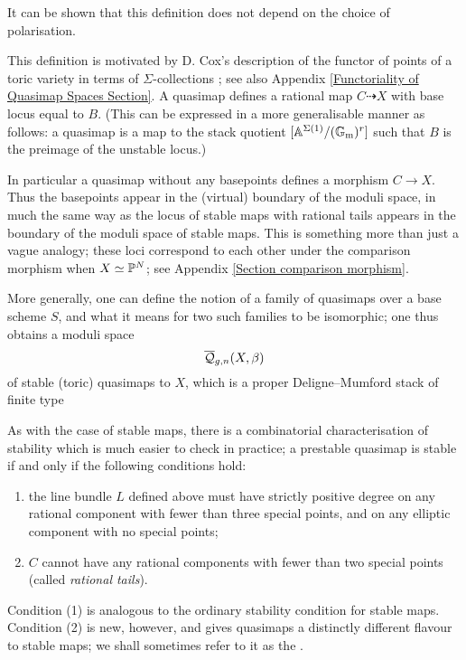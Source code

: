It can be shown that this definition does not depend on the choice of polarisation.

\begin{remark} This definition is motivated by D. Cox's description of the functor of points of a toric variety in terms of $\Sigma$-collections \cite{CoxFunctor}; see also Appendix \ref{Functoriality of Quasimap Spaces Section}. A quasimap defines a rational map $C \dashrightarrow X$ with base locus equal to $B$. (This can be expressed in a more generalisable manner as follows: a quasimap is a map to the stack quotient $[\mathbb{A}^{\Sigma(1)} / (\mathbb{G}_{\text{m}})^r]$ such that $B$ is the preimage of the unstable locus.)

In particular a quasimap without any basepoints defines a morphism $C \to X$. Thus the basepoints appear in the (virtual) boundary of the moduli space, in much the same way as the locus of stable maps with rational tails appears in the boundary of the moduli space of stable maps. This is something more than just a vague analogy; these loci correspond to each other under the comparison morphism when $X\simeq\mathbb P^N$; see Appendix \ref{Section comparison morphism}. \end{remark}

More generally, one can define the notion of a family of quasimaps over a base scheme $S$, and what it means for two such families to be isomorphic; one thus obtains a moduli space
\begin{equation*} \overline{\mathcal Q}_{g,n}(X,\beta) \end{equation*}
of stable (toric) quasimaps to $X$, which is a proper Deligne--Mumford stack of finite type \cite[\S 3]{CF-K}

As with the case of stable maps, there is a combinatorial characterisation of stability which is much easier to check in practice; a prestable quasimap is stable if and only if the following conditions hold:
\begin{enumerate}
\item the line bundle $L$ defined above must have strictly positive degree on any rational component with fewer than three special points, and on any elliptic component with no special points;
\item $C$ cannot have any rational components with fewer than two special points (called \emph{rational tails}).
\end{enumerate}
Condition (1) is analogous to the ordinary stability condition for stable maps. Condition (2) is new, however, and gives quasimaps a distinctly different flavour to stable maps; we shall sometimes refer to it as the . 


